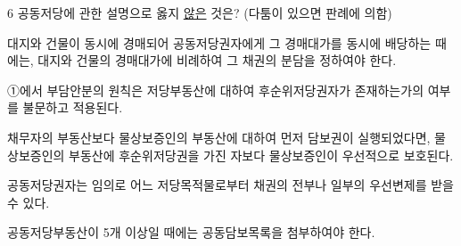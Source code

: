 \begin{question}{6}
공동저당에 관한 설명으로 옳지 \uline{않은} 것은? (다툼이 있으면 판례에 의함)
\begin{choices}
  \item 대지와 건물이 동시에 경매되어 공동저당권자에게 그 경매대가를 동시에 배당하는 때에는, 대지와 건물의 경매대가에 비례하여 그 채권의 분담을 정하여야 한다.
  \item ①에서 부담안분의 원칙은 저당부동산에 대하여 후순위저당권자가 존재하는가의 여부를 불문하고 적용된다.
  \item 채무자의 부동산보다 물상보증인의 부동산에 대하여 먼저 담보권이 실행되었다면, 물상보증인의 부동산에 후순위저당권을 가진 자보다 물상보증인이 우선적으로 보호된다.
  \item 공동저당권자는 임의로 어느 저당목적물로부터 채권의 전부나 일부의 우선변제를 받을 수 있다.
  \item 공동저당부동산이 5개 이상일 때에는 공동담보목록을 첨부하여야 한다.
\end{choices}
\end{question}
